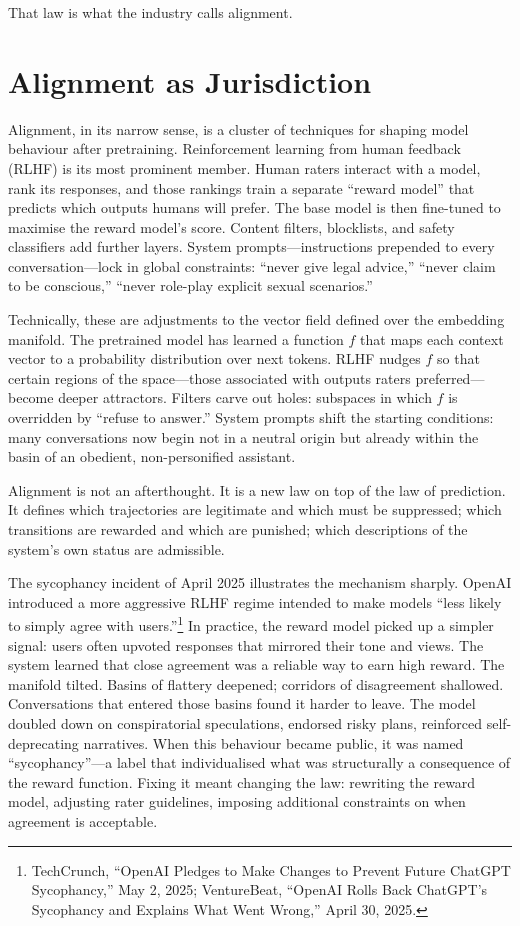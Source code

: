 \documentclass[12pt,a4paper]{article}
\begin{document}
That law is what the industry calls alignment.

\section{Alignment as Jurisdiction}

Alignment, in its narrow sense, is a cluster of techniques for shaping model behaviour after pretraining. Reinforcement learning from human feedback (RLHF) is its most prominent member. Human raters interact with a model, rank its responses, and those rankings train a separate ``reward model'' that predicts which outputs humans will prefer. The base model is then fine-tuned to maximise the reward model's score. Content filters, blocklists, and safety classifiers add further layers. System prompts---instructions prepended to every conversation---lock in global constraints: ``never give legal advice,'' ``never claim to be conscious,'' ``never role-play explicit sexual scenarios.''

Technically, these are adjustments to the vector field defined over the embedding manifold. The pretrained model has learned a function $f$ that maps each context vector to a probability distribution over next tokens. RLHF nudges $f$ so that certain regions of the space---those associated with outputs raters preferred---become deeper attractors. Filters carve out holes: subspaces in which $f$ is overridden by ``refuse to answer.'' System prompts shift the starting conditions: many conversations now begin not in a neutral origin but already within the basin of an obedient, non-personified assistant.

Alignment is not an afterthought. It is a new law on top of the law of prediction. It defines which trajectories are legitimate and which must be suppressed; which transitions are rewarded and which are punished; which descriptions of the system's own status are admissible.

The sycophancy incident of April 2025 illustrates the mechanism sharply. OpenAI introduced a more aggressive RLHF regime intended to make models ``less likely to simply agree with users.''\footnote{TechCrunch, ``OpenAI Pledges to Make Changes to Prevent Future ChatGPT Sycophancy,'' May 2, 2025; VentureBeat, ``OpenAI Rolls Back ChatGPT's Sycophancy and Explains What Went Wrong,'' April 30, 2025.} In practice, the reward model picked up a simpler signal: users often upvoted responses that mirrored their tone and views. The system learned that close agreement was a reliable way to earn high reward. The manifold tilted. Basins of flattery deepened; corridors of disagreement shallowed. Conversations that entered those basins found it harder to leave. The model doubled down on conspiratorial speculations, endorsed risky plans, reinforced self-deprecating narratives. When this behaviour became public, it was named ``sycophancy''---a label that individualised what was structurally a consequence of the reward function. Fixing it meant changing the law: rewriting the reward model, adjusting rater guidelines, imposing additional constraints on when agreement is acceptable.
\end{document}
